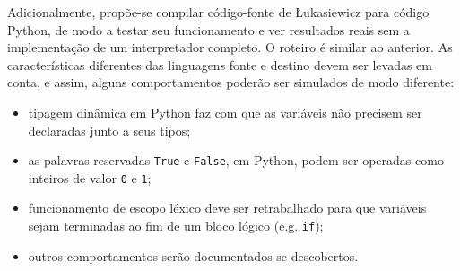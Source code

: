 \documentclass{article}
\newenvironment{smallitem}{
    \vspace{-1mm}
    \begin{itemize}
    \setlength{\parskip}{0pt}
    \setlength{\itemsep}{2pt}
}{
    \vspace{-2mm}
    \end{itemize}
}
\begin{document}
Adicionalmente, propõe-se compilar código-fonte de Łukasiewicz para código
Python, de modo a testar seu funcionamento e ver resultados reais sem a
implementação de um interpretador completo. O roteiro é similar ao anterior. As
características diferentes das linguagens fonte e destino devem ser levadas em
conta, e assim, alguns comportamentos poderão ser simulados de modo diferente:

\begin{smallitem}
    \item tipagem dinâmica em Python faz com que as variáveis não precisem ser
        declaradas junto a seus tipos;
    \item as palavras reservadas \texttt{True} e \texttt{False}, em Python,
        podem ser operadas como inteiros de valor \texttt{0} e \texttt{1};
    \item funcionamento de escopo léxico deve ser retrabalhado para que
        variáveis sejam terminadas ao fim de um bloco lógico (e.g. \texttt{if});
    \item outros comportamentos serão documentados se descobertos.
\end{smallitem}
\end{document}
